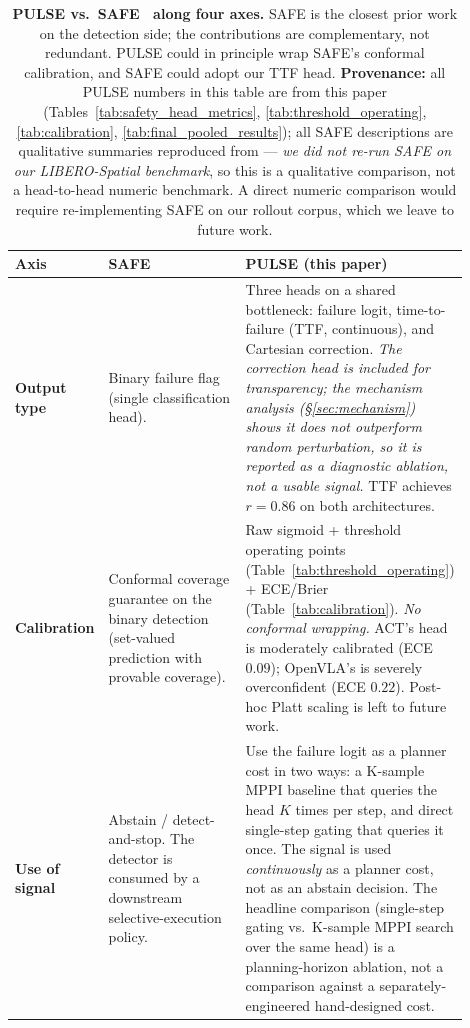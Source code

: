\begin{table}[t]
\centering
\caption{\textbf{PULSE vs.\ SAFE~\citep{safe_paper} along four axes.} SAFE is the closest prior work on the detection side; the contributions are complementary, not redundant. PULSE could in principle wrap SAFE's conformal calibration, and SAFE could adopt our TTF head. \textbf{Provenance:} all PULSE numbers in this table are from this paper (Tables~\ref{tab:safety_head_metrics}, \ref{tab:threshold_operating}, \ref{tab:calibration}, \ref{tab:final_pooled_results}); all SAFE descriptions are qualitative summaries reproduced from \citet{safe_paper} --- \emph{we did not re-run SAFE on our LIBERO-Spatial benchmark}, so this is a qualitative comparison, not a head-to-head numeric benchmark. A direct numeric comparison would require re-implementing SAFE on our rollout corpus, which we leave to future work.}
\label{tab:safe_vs_pulse}
\small
\begin{tabular}{p{0.20\linewidth} p{0.32\linewidth} p{0.38\linewidth}}
\toprule
\textbf{Axis} & \textbf{SAFE~\citep{safe_paper}} & \textbf{PULSE (this paper)} \\
\midrule
\textbf{Output type}        &
Binary failure flag (single classification head).        &
Three heads on a shared bottleneck: failure logit, time-to-failure (TTF, continuous), and Cartesian correction. \emph{The correction head is included for transparency; the mechanism analysis (§\ref{sec:mechanism}) shows it does not outperform random perturbation, so it is reported as a diagnostic ablation, not a usable signal.} TTF achieves $r{=}0.86$ on both architectures. \\
\midrule
\textbf{Calibration}        &
Conformal coverage guarantee on the binary detection (set-valued prediction with provable coverage). &
Raw sigmoid + threshold operating points (Table~\ref{tab:threshold_operating}) + ECE/Brier (Table~\ref{tab:calibration}). \emph{No conformal wrapping.} ACT's head is moderately calibrated (ECE $0.09$); OpenVLA's is severely overconfident (ECE $0.22$). Post-hoc Platt scaling is left to future work. \\
\midrule
\textbf{Use of signal}      &
Abstain / detect-and-stop. The detector is consumed by a downstream selective-execution policy. &
Use the failure logit as a planner cost in two ways: a K-sample MPPI baseline that queries the head $K$ times per step, and direct single-step gating that queries it once. The signal is used \emph{continuously} as a planner cost, not as an abstain decision. The headline comparison (single-step gating vs.\ K-sample MPPI search over the same head) is a planning-horizon ablation, not a comparison against a separately-engineered hand-designed cost. \\

\end{tabular}
\end{table}
